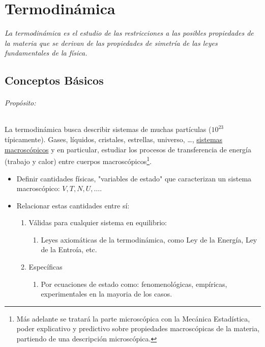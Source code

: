 \part{Termodinámica}

\vspace*{\fill}

\begin{center}
	\textit{La termodinámica es el estudio de las restricciones a las posibles propiedades de la materia que se derivan de las propiedades de simetría de las leyes fundamentales de la física.}
\end{center}

\vspace*{\fill}

\chapter{Conceptos Básicos}

\paragraph{Propósito: } La termodinámica busca describir sistemas de muchas partículas ($10^{23}$ típicamente). Gases, líquidos, cristales, estrellas, universo, \ldots ,  \underline{sistemas macroscópicos} y en particular, estudiar los procesos de transferencia de energía (trabajo y calor) entre cuerpos macroscópicos\footnote{Más adelante se tratará la parte microscópica con la Mecánica Estadística, poder explicativo y predictivo sobre propiedades macroscópicas de la materia, partiendo de una descripción microscópica.}. 

\begin{itemize}
	\item Definir cantidades físicas, "variables de estado" que caracterizan un sistema macroscópico: $V,T,N,U,\ldots$.
	\item Relacionar estas cantidades entre sí:
		\begin{enumerate}
			\item Válidas para cualquier sistema en equilibrio:
			\begin{enumerate}
				\item Leyes axiomáticas de la termodinámica, como Ley de la Energía, Ley de la Entroía, etc.
			\end{enumerate}
			\item Específicas
			\begin{enumerate}
				\item Por ecuaciones de estado como: fenomenológicas, empíricas, experimentales en la mayoria de los casos.
			\end{enumerate}
		\end{enumerate}
\end{itemize}


